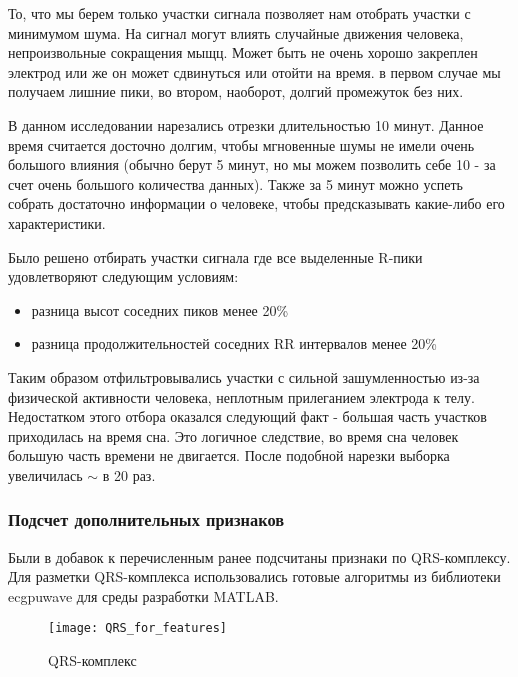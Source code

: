 То, что мы берем только участки сигнала позволяет нам отобрать участки с минимумом шума. На сигнал могут влиять случайные движения человека, непроизвольные сокращения мыщц. Может быть не очень хорошо закреплен электрод или же он может сдвинуться или отойти на время. в первом случае мы получаем лишние пики, во втором, наоборот, долгий промежуток без них. 

В данном исследовании нарезались отрезки длительностью 10 минут. Данное время считается досточно долгим, чтобы мгновенные шумы не имели очень большого влияния (обычно берут 5 минут, но мы можем позволить себе 10 - за счет очень большого количества данных). Также за 5 минут можно успеть собрать достаточно информации о человеке, чтобы предсказывать какие-либо его характеристики. 


Было решено отбирать участки сигнала где все выделенные R-пики удовлетворяют следующим условиям:

\begin{itemize}
	\item разница высот соседних пиков менее 20\%
	\item разница продолжительностей соседних RR интервалов менее 20\%
\end{itemize}

Таким образом отфильтровывались участки с сильной зашумленностью из-за физической активности человека, неплотным прилеганием электрода к телу. Недостатком этого отбора оказался следующий факт - большая часть участков приходилась на время сна. Это логичное следствие, во время сна человек большую часть времени не двигается. После подобной нарезки выборка увеличилась $\sim$ в 20 раз.

\subsubsection{Подсчет дополнительных признаков}

Были в добавок к перечисленным ранее подсчитаны признаки по QRS-комплексу. Для разметки QRS-комплекса использовались готовые алгоритмы из библиотеки ecgpuwave для среды разработки MATLAB.

\begin{figure}[h!]
	\begin{center}
		\texttt{[image: QRS\_for\_features]}
		\caption{QRS-комплекс}
		\label{ris:QRS}
	\end{center}
\end{figure}


